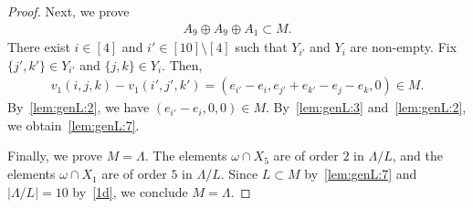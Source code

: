 \documentclass[10pt,a4paper]{amsart}
\newcommand{\aes}{\omega}
\begin{document}
\begin{proof}
	Next, we prove
	\begin{align}	\label{lem:genL:7}
		A_9 \oplus A_9 \oplus A_1  \subset M.
	\end{align}
	There exist $i \in [4]$ and $i' \in [10] \setminus [4]$ such that $Y_{i'}$ and $Y_i$ are non-empty.
	Fix $\{ j',k' \} \in Y_{i'}$ and $\{j,k\} \in Y_{i}$.
	Then,
	\begin{align*}
		v_1(i,j,k)-v_1(i',j',k') = (e_{i'} - e_i , e_{j'} + e_{k'} - e_j - e_k , 0) \in M.
	\end{align*}
	By~\eqref{lem:genL:2}, we have
	$
		(e_{i'} - e_i , 0 , 0) \in M.
	$
	By~\eqref{lem:genL:3} and~\eqref{lem:genL:2}, we obtain~\eqref{lem:genL:7}.

	Finally, we prove $M=\Lambda$.
	The elements $\aes \cap X_5$ are of order $2$ in $\Lambda/L$, and the elements $\aes \cap X_1$ are of order $5$ in $\Lambda/L$.
	Since $L \subset M$ by~\eqref{lem:genL:7} and $|\Lambda/L|=10$ by~\eqref{1d},
	we conclude $M= \Lambda$.
\end{proof}
\end{document}
